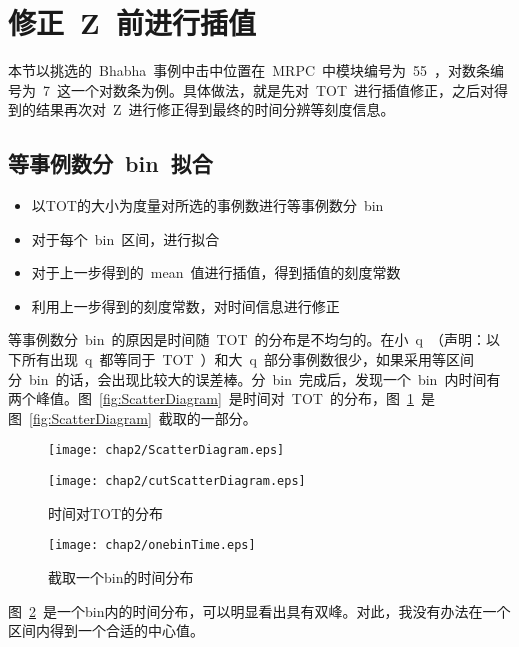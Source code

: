\section{修正~Z~前进行插值}

本节以挑选的~Bhabha~事例中击中位置在~MRPC~中模块编号为~55~，对数条编号为~7~这一个对数条为例。具体做法，就是先对~TOT~进行插值修正，之后对得到的结果再次对~Z~进行修正得到最终的时间分辨等刻度信息。
\subsection{等事例数分~bin~拟合}
\begin{itemize}
    \item 以TOT的大小为度量对所选的事例数进行等事例数分~bin~
    \item 对于每个~bin~区间，进行拟合
    \item 对于上一步得到的~mean~值进行插值，得到插值的刻度常数
    \item 利用上一步得到的刻度常数，对时间信息进行修正 
\end{itemize}
等事例数分~bin~的原因是时间随~TOT~的分布是不均匀的。在小~q~（声明：以下所有出现~q~都等同于~TOT~）和大~q~部分事例数很少，如果采用等区间分~bin~的话，会出现比较大的误差棒。分~bin~完成后，发现一个~bin~内时间有两个峰值。图~\ref{fig:ScatterDiagram}~是时间对~TOT~的分布，图~\ref{fig:cutScatterDiagram}~是图~\ref{fig:ScatterDiagram}~截取的一部分。

\begin{figure}[htbp]
\begin{minipage}[t]{0.5\linewidth}
\texttt{[image: chap2/ScatterDiagram.eps]}
\label{fig:ScatterDiagram}
\end{minipage}%
\hfill
\begin{minipage}[t]{0.5\linewidth}
\texttt{[image: chap2/cutScatterDiagram.eps]}
\label{fig:cutScatterDiagram}
\end{minipage}
\caption{时间对TOT的分布}
\end{figure}

\begin{figure}[htbp]
\centering
\texttt{[image: chap2/onebinTime.eps]}
\caption{截取一个bin的时间分布}
\label{fig:onebinTime}
\end{figure}

图~\ref{fig:onebinTime}~是一个bin内的时间分布，可以明显看出具有双峰。对此，我没有办法在一个区间内得到一个合适的中心值。

